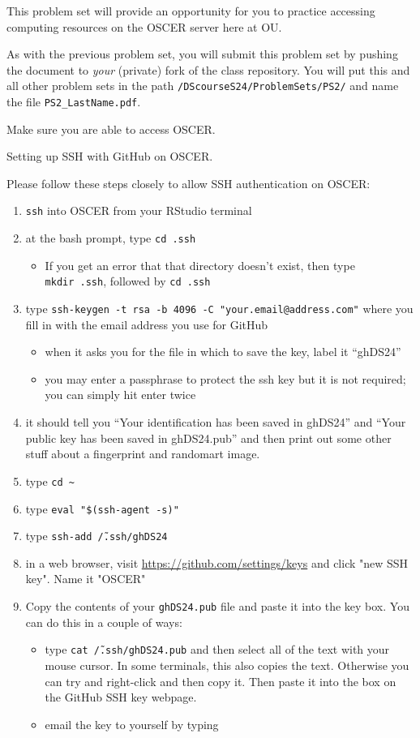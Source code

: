\documentclass[12pt,english]{exam}
\begin{document}
This problem set will provide an opportunity for you to practice accessing computing resources on the OSCER server here at OU.

As with the previous problem set, you will submit this problem set by pushing the document to \emph{your} (private) fork of the class repository. You will put this and all other problem sets in the path \texttt{/DScourseS24/ProblemSets/PS2/} and name the file \texttt{PS2\_LastName.pdf}.
\begin{questions}
\question Make sure you are able to access OSCER.

\question Setting up SSH with GitHub on OSCER.

Please follow these steps closely to allow SSH authentication on OSCER:

\begin{enumerate}
    \item \texttt{ssh} into OSCER from your RStudio terminal
    \item at the bash prompt, type \texttt{cd\ .ssh}
    \begin{itemize}
        \item If you get an error that that directory doesn't exist, then type \texttt{mkdir\ .ssh}, followed by \texttt{cd\ .ssh} 
    \end{itemize}
    \item type \texttt{ssh-keygen -t rsa -b 4096 -C "your.email@address.com"} where you fill in with the email address you use for GitHub
    \begin{itemize}
        \item when it asks you for the file in which to save the key, label it ``ghDS24''
        \item you may enter a passphrase to protect the ssh key but it is not required; you can simply hit enter twice
    \end{itemize}
    \item it should tell you ``Your identification has been saved in ghDS24'' and ``Your public key has been saved in ghDS24.pub'' and then print out some other stuff about a fingerprint and randomart image.
    \item type \texttt{cd \~}
    \item type \texttt{eval "\$(ssh-agent -s)"}
    \item type \texttt{ssh-add \~/.ssh/ghDS24}
    \item in a web browser, visit \url{https://github.com/settings/keys} and click "new SSH key". Name it "OSCER"
    \item Copy the contents of your \texttt{ghDS24.pub} file and paste it into the key box. You can do this in a couple of ways:
    \begin{itemize}
        \item type \texttt{cat \~/.ssh/ghDS24.pub} and then select all of the text with your mouse cursor. In some terminals, this also copies the text. Otherwise you can try and right-click and then copy it. Then paste it into the box on the GitHub SSH key webpage.
        \item email the key to yourself by typing
        

\end{itemize}
\end{enumerate}
\end{questions}
\end{document}
